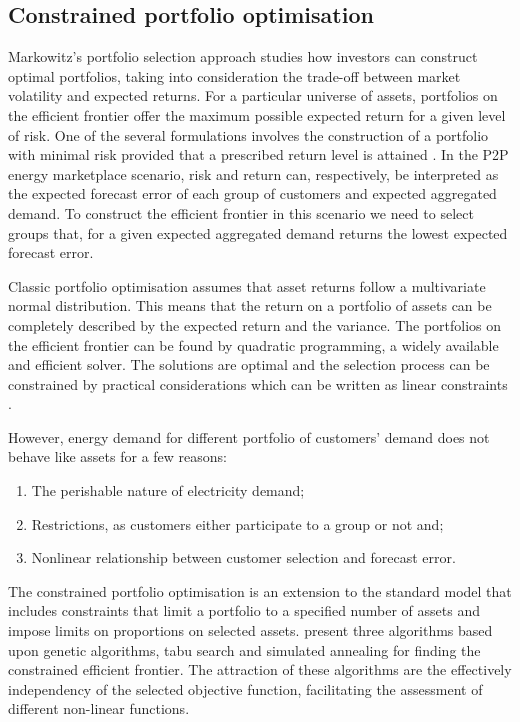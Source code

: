 \documentclass[preprint,3p,12pt,authoryear]{elsarticle}
\begin{document}
\subsection{Constrained portfolio optimisation}
\label{ss:sdevgrp}
Markowitz’s portfolio selection approach studies how investors can construct optimal portfolios, taking into consideration the trade-off between market volatility and expected returns.
For a particular universe of assets, portfolios on the efficient frontier offer the maximum possible expected return for a given level of risk.
One of the several formulations involves the construction of a portfolio with minimal risk provided that a prescribed return level is attained \citep{bonami2009portopt}.
In the P2P energy marketplace scenario, risk and return can, respectively, be interpreted as the expected forecast error of each group of customers and expected aggregated demand.
To construct the efficient frontier in this scenario we need to select groups that, for a given expected aggregated demand returns the lowest expected forecast error.

Classic portfolio optimisation assumes that asset returns follow a multivariate normal distribution.
This means that the return on a portfolio of assets can be completely described by the expected return and the variance.
The portfolios on the efficient frontier can be found by quadratic programming, a widely available and efficient solver.
The solutions are optimal and the selection process can be constrained by practical considerations which can be written as linear constraints \citep{CHANG20001271}.

However, energy demand for different portfolio of customers' demand does not behave like assets for a few reasons:
\begin{enumerate}
   \item The perishable nature of electricity demand;
   \item Restrictions, as customers either participate to a group or not and;
   \item Nonlinear relationship between customer selection and forecast error.
\end{enumerate}

The constrained portfolio optimisation is an extension to the standard model that includes constraints that limit a portfolio to a specified number of assets and impose limits on proportions on selected assets.
\citet{CHANG20001271} present three algorithms based upon genetic algorithms, tabu search and simulated annealing for finding the constrained efficient frontier.
The attraction of these algorithms are the effectively independency of the selected objective function, facilitating the assessment of different non-linear functions.
\end{document}
